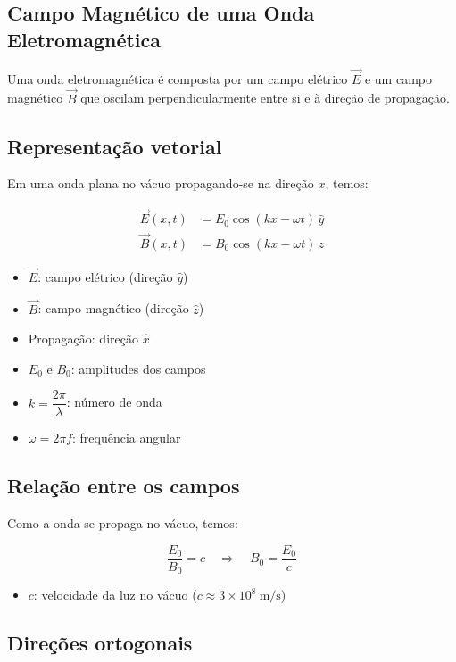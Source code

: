 \documentclass[a4paper,12pt]{article}
\begin{document}
\begin{multicols}{2}
\section{Campo Magnético de uma Onda Eletromagnética}

Uma onda eletromagnética é composta por um campo elétrico $\vec{E}$ e um campo magnético $\vec{B}$ que oscilam perpendicularmente entre si e à direção de propagação.

\subsection{Representação vetorial}

Em uma onda plana no vácuo propagando-se na direção $x$, temos:

\begin{align*}
\vec{E}(x, t) &= E_0 \cos(kx - \omega t) \, \hat{y} \\
\vec{B}(x, t) &= B_0 \cos(kx - \omega t) \, \hat{z}
\end{align*}

\begin{itemize}
  \item $\vec{E}$: campo elétrico (direção $\hat{y}$)
  \item $\vec{B}$: campo magnético (direção $\hat{z}$)
  \item Propagação: direção $\hat{x}$
  \item $E_0$ e $B_0$: amplitudes dos campos
  \item $k = \dfrac{2\pi}{\lambda}$: número de onda
  \item $\omega = 2\pi f$: frequência angular
\end{itemize}

\subsection*{Relação entre os campos}

Como a onda se propaga no vácuo, temos:

\[
\frac{E_0}{B_0} = c
\quad \Rightarrow \quad
B_0 = \frac{E_0}{c}
\]

\begin{itemize}
  \item $c$: velocidade da luz no vácuo ($c \approx 3 \times 10^8~\text{m/s}$)
\end{itemize}

\subsection*{Direções ortogonais}


\end{multicols}
\end{document}
